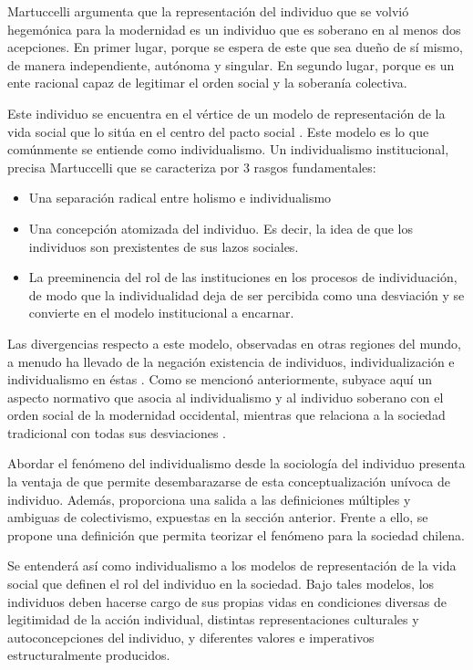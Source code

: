 \documentclass[12pt,twoside]{templates/facsothesis}
\providecommand{\tightlist}{%
  \setlength{\itemsep}{0pt}\setlength{\parskip}{0pt}}
\begin{document}
Martuccelli \citeyearpar{martuccelli2010} argumenta que la representación del individuo que se volvió hegemónica para la modernidad es un individuo que es soberano en al menos dos acepciones. En primer lugar, porque se espera de este que sea dueño de sí mismo, de manera independiente, autónoma y singular. En segundo lugar, porque es un ente racional capaz de legitimar el orden social y la soberanía colectiva.

Este individuo se encuentra en el vértice de un modelo de representación de la vida social que lo sitúa en el centro del pacto social \citep{martuccelli2010, martuccelli2018}. Este modelo es lo que comúnmente se entiende como individualismo. Un individualismo institucional, precisa Martuccelli \citeyearpar{martuccelli2018} que se caracteriza por 3 rasgos fundamentales:

\begin{itemize}
\tightlist
\item
  Una separación radical entre holismo e individualismo
\item
  Una concepción atomizada del individuo. Es decir, la idea de que los individuos son prexistentes de sus lazos sociales.
\item
  La preeminencia del rol de las instituciones en los procesos de individuación, de modo que la individualidad deja de ser percibida como una desviación y se convierte en el modelo institucional a encarnar.
\end{itemize}

Las divergencias respecto a este modelo, observadas en otras regiones del mundo, a menudo ha llevado de la negación existencia de individuos, individualización e individualismo en éstas \citep{martuccelli2010}. Como se mencionó anteriormente, subyace aquí un aspecto normativo que asocia al individualismo y al individuo soberano con el orden social de la modernidad occidental, mientras que relaciona a la sociedad tradicional con todas sus desviaciones \citep{martuccelli2018}.

Abordar el fenómeno del individualismo desde la sociología del individuo presenta la ventaja de que permite desembarazarse de esta conceptualización unívoca de individuo. Además, proporciona una salida a las definiciones múltiples y ambiguas de colectivismo, expuestas en la sección anterior. Frente a ello, se propone una definición que permita teorizar el fenómeno para la sociedad chilena.

Se entenderá así como individualismo a los modelos de representación de la vida social que definen el rol del individuo en la sociedad. Bajo tales modelos, los individuos deben hacerse cargo de sus propias vidas en condiciones diversas de legitimidad de la acción individual, distintas representaciones culturales y autoconcepciones del individuo, y diferentes valores e imperativos estructuralmente producidos.
\end{document}
